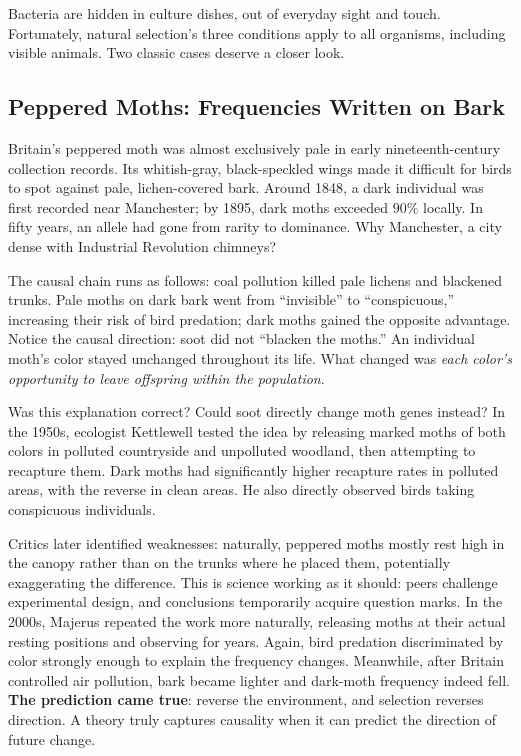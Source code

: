 Bacteria are hidden in culture dishes, out of everyday sight and touch. Fortunately, natural selection's three conditions apply to all organisms, including visible animals. Two classic cases deserve a closer look.

\subsection{Peppered Moths: Frequencies Written on Bark}

Britain's peppered moth was almost exclusively pale in early nineteenth-century collection records. Its whitish-gray, black-speckled wings made it difficult for birds to spot against pale, lichen-covered bark. Around 1848, a dark individual was first recorded near Manchester; by 1895, dark moths exceeded $90\%$ locally. In fifty years, an allele had gone from rarity to dominance. Why Manchester, a city dense with Industrial Revolution chimneys?

The causal chain runs as follows: coal pollution killed pale lichens and blackened trunks. Pale moths on dark bark went from ``invisible'' to ``conspicuous,'' increasing their risk of bird predation; dark moths gained the opposite advantage. Notice the causal direction: soot did not ``blacken the moths.'' An individual moth's color stayed unchanged throughout its life. What changed was \emph{each color's opportunity to leave offspring within the population}.

\begin{zhengju}
Was this explanation correct? Could soot directly change moth genes instead? In the 1950s, ecologist Kettlewell tested the idea by releasing marked moths of both colors in polluted countryside and unpolluted woodland, then attempting to recapture them. Dark moths had significantly higher recapture rates in polluted areas, with the reverse in clean areas. He also directly observed birds taking conspicuous individuals.

Critics later identified weaknesses: naturally, peppered moths mostly rest high in the canopy rather than on the trunks where he placed them, potentially exaggerating the difference. This is science working as it should: peers challenge experimental design, and conclusions temporarily acquire question marks. In the 2000s, Majerus repeated the work more naturally, releasing moths at their actual resting positions and observing for years. Again, bird predation discriminated by color strongly enough to explain the frequency changes. Meanwhile, after Britain controlled air pollution, bark became lighter and dark-moth frequency indeed fell. \textbf{The prediction came true}: reverse the environment, and selection reverses direction. A theory truly captures causality when it can predict the direction of future change.
\end{zhengju}

